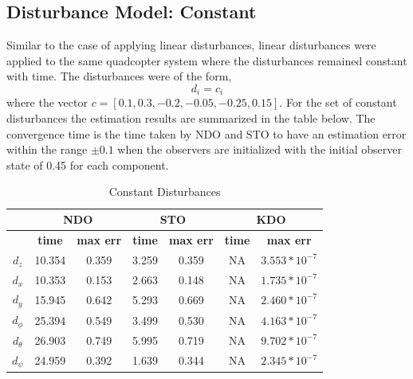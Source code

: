 \documentclass[letterpaper%
, twoside%
, 12pt%
,memoire%
, english%
,creativecommons,hyperref%
]{thETS}
\begin{document}
\subsection{Disturbance Model: Constant}
Similar to the case of applying linear disturbances, linear disturbances were applied to the same quadcopter system where the disturbances remained constant with time. The disturbances were of the form, 
\begin{equation}
d_i = c_i
\label{eq:dist_4}
\end{equation}
where the vector $c=[0.1,0.3,-0.2,-0.05,-0.25,0.15]$. 
For the set of constant disturbances the estimation results are summarized in the table below. The convergence time is the time taken by NDO and STO to have an estimation error within the range $\pm0.1$ when the observers are initialized with the initial observer state of 0.45 for each component.
\begin{table}[!htbp]
\centering
\caption{Constant Disturbances}
\begin{tabular}{|c|c|c|c|c|c|c|}
\hline
{}  &  \multicolumn{2}{c|}{\textbf{NDO}} & \multicolumn{2}{c|}{\textbf{STO}} & \multicolumn{2}{c|}{\textbf{KDO}}\\
\hline
{}        &  \textbf{time}  & \textbf{max err}  & \textbf{time}  & \textbf{max err}& \textbf{time}  & \textbf{max err}\\
$d_z$     &  10.354 & 0.359   & 3.259  & 0.359 & NA     & $3.553*10^{-7}$\\
$d_x$     &  10.353 & 0.153   & 2.663  & 0.148 & NA     & $1.735*10^{-7}$\\
$d_y$     &  15.945 & 0.642   & 5.293  & 0.669 & NA     & $2.460*10^{-7}$\\
$d_\phi$  &  25.394 & 0.549   & 3.499  & 0.530 & NA     & $4.163*10^{-7}$\\
$d_\theta$&  26.903 & 0.749   & 5.995  & 0.719 & NA     & $9.702*10^{-7}$\\
$d_\psi$  &  24.959 & 0.392   & 1.639  & 0.344 & NA     & $2.345*10^{-7}$\\
\hline
\end{tabular}
\end{table}
\end{document}
